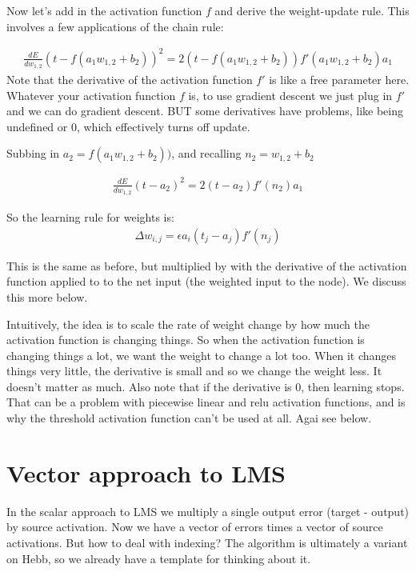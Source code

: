 Now let's add in the activation function $f$ and derive the weight-update rule.  This involves a few applications of the chain rule:

\begin{eqnarray*}
\frac{dE}{dw_{1,2}} (t - f(a_1w_{1,2} + b_2))^2   = 2 (t - f(a_1w_{1,2} + b_2)) f'(a_1w_{1,2} + b_2) a_1 
\end{eqnarray*}
Note that the derivative of the activation function $f'$ is like a free parameter here. Whatever your activation function $f$ is, to use gradient descent we just plug in $f'$ and we can do gradient descent. BUT some derivatives have problems, like being undefined or 0, which effectively turns off update.

Subbing in $a_2 = f(a_1w_{1,2} + b_2))$, and recalling $n_2 = w_{1,2} + b_2$ 

\begin{eqnarray*}
\frac{dE}{dw_{1,2}} (t - a_2)^2   = 2 (t - a_2) f'(n_2) a_1 
\end{eqnarray*}

So the learning rule for weights is:
\begin{eqnarray*}
\Delta w_{i,j}  =  \epsilon a_i (t_j - a_j) f'(n_j)
\end{eqnarray*} 

This is the same as before, but multiplied by with the derivative of the activation function applied to to the net input (the weighted input to the node). We discuss this more below.

Intuitively, the idea is to scale the rate of weight change by how much the activation function is changing things. So when the activation function is changing things a lot, we want the weight to change a lot too. When it changes things very little, the derivative is small and so we change the weight less.  It doesn't matter as much.  Also note that if the derivative is 0, then learning stops. That can be a problem with piecewise linear and relu activation functions, and is why the threshold activation function can't be used at all.  Agai see below.

\section{Vector approach to LMS}


In the scalar approach to LMS we multiply a single output error (target - output) by source activation. Now we have a vector of errors times a vector of source activations. But how to deal with indexing?  The algorithm is ultimately a variant on Hebb, so we already have a template for thinking about it.

